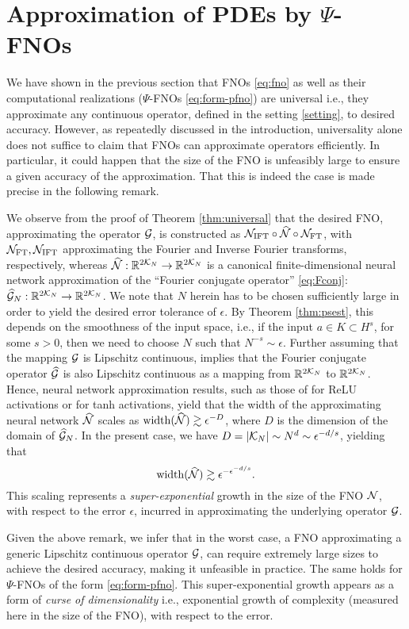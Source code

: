 \documentclass[reqno,a4paper]{amsart}
\begin{document}
\section{Approximation of PDEs by {$\Psi$}-FNOs}
\label{sec:3}
We have shown in the previous section that FNOs \eqref{eq:fno} as well as their computational realizations ($\Psi$-FNOs \eqref{eq:form-pfno}) are universal i.e., they approximate any continuous operator, defined in the setting \ref{setting}, to desired accuracy. However, as repeatedly discussed in the introduction, universality alone does not suffice to claim that FNOs can approximate operators efficiently. In particular, it could happen that the size of the FNO is  unfeasibly large to ensure a given accuracy of the approximation. That this is indeed the case is made precise in the following remark.
\begin{remark}
\label{rem:comp}
We observe from the proof of Theorem \ref{thm:universal} that the desired FNO, approximating the operator $\mathcal{G}$, is constructed as  $\mathcal{N}_{\mathrm{IFT}} \circ \widehat{\mathcal{N}} \circ \mathcal{N}_{\mathrm{FT}}$, with $\mathcal{N}_{\mathrm{FT}},\mathcal{N}_{\mathrm{IFT}}$ approximating the Fourier and Inverse Fourier transforms, respectively, whereas $\widehat{\mathcal{N}}: \mathbb{R}^{2\mathcal{K}_N} \to \mathbb{R}^{2\mathcal{K}_N}$ is a canonical finite-dimensional neural network approximation of the ``Fourier conjugate operator'' \eqref{eq:Fconj}: $\widehat{\mathcal{G}}_N: \mathbb{R}^{2\mathcal{K}_N} \to \mathbb{R}^{2\mathcal{K}_N}$. We note that $N$ herein has to be chosen sufficiently large in order to yield the desired error tolerance of $\epsilon$. By Theorem \ref{thm:psest}, this depends on the smoothness of the input space, i.e., if the input $a\in K \subset H^s$, for some $s > 0$, then we need to choose $N$ such that $N^{-s} \sim \epsilon$. Further assuming that the mapping $\mathcal{G}$ is Lipschitz continuous, implies that the Fourier conjugate operator $\widehat{\mathcal{G}}$ is also Lipschitz continuous as a mapping from $\mathbb{R}^{2\mathcal{K}_N}$ to $\mathbb{R}^{2\mathcal{K}_N}$. Hence, neural network approximation results, such as those of \cite{Yar1} for ReLU activations or \cite{DLM1} for tanh activations, yield that the width of the approximating neural network $\widehat{\mathcal{N}}$ scales as  $\mathrm{width}(\widehat{\mathcal{N}}) \gtrsim \epsilon^{-D}$, where $D$ is the dimension of the domain of $\widehat{\mathcal{G}}_N$. In the present case, we have $D = |\mathcal{K}_N| \sim N^d \sim \epsilon^{-d/s}$, yielding that 
\begin{equation}
    \label{eq:comp}
\mathrm{width}(\widehat{\mathcal{N}}) \gtrsim \epsilon^{-\epsilon^{-d/s}}. 
\end{equation}
This scaling represents a \emph{super-exponential} growth in the size of the FNO $\mathcal{N}$, with respect to the error $\epsilon$, incurred in approximating the underlying operator $\mathcal{G}$.
\end{remark}
Given the above remark, we infer that in the worst case, a FNO approximating a generic Lipschitz continuous operator $\mathcal{G}$, can require extremely large sizes to achieve the desired accuracy, making it unfeasible in practice. The same holds for $\Psi$-FNOs of the form \eqref{eq:form-pfno}. This super-exponential growth appears as a form of \emph{curse of dimensionality} i.e., exponential growth of complexity (measured here in the size of the FNO), with respect to the error. 
\end{document}
